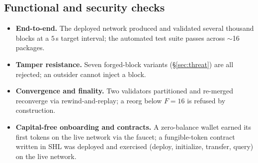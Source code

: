 \subsection{Functional and security checks}
\begin{itemize}
  \item \textbf{End-to-end.} The deployed network produced and validated several thousand
  blocks at a $5$\,s target interval; the automated test suite passes across $\sim$16 packages.
  \item \textbf{Tamper resistance.} Seven forged-block variants (\S\ref{sec:threat}) are all
  rejected; an outsider cannot inject a block.
  \item \textbf{Convergence and finality.} Two validators partitioned and re-merged reconverge
  via rewind-and-replay; a reorg below $F{=}16$ is refused by construction.
  \item \textbf{Capital-free onboarding and contracts.} A zero-balance wallet earned its first
  tokens on the live network via the faucet; a fungible-token contract written in SHL was
  deployed and exercised (deploy, initialize, transfer, query) on the live network.
\end{itemize}
